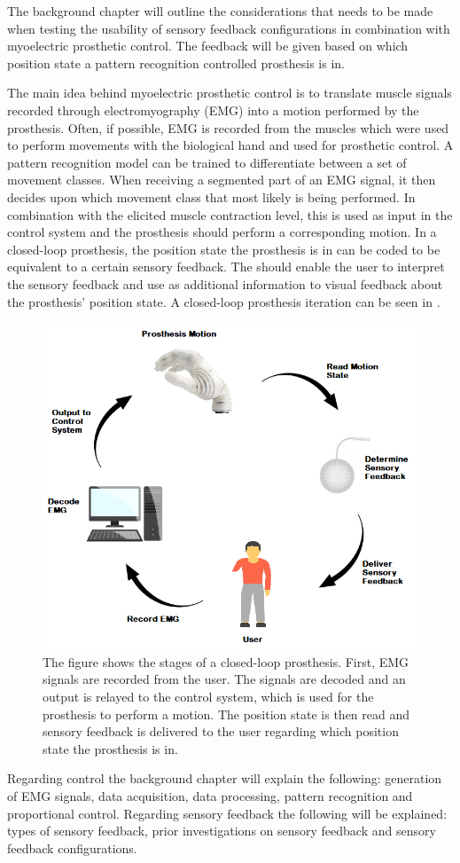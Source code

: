 The background chapter will outline the considerations that needs to be made when testing the usability of sensory feedback configurations in combination with myoelectric prosthetic control. The feedback will be given based on which position state a pattern recognition controlled prosthesis is in. 

The main idea behind myoelectric prosthetic control is to translate muscle signals recorded through electromyography (EMG) into a motion performed by the prosthesis. Often, if possible, EMG is recorded from the muscles which were used to perform movements with the biological hand and used for prosthetic control. A pattern recognition model can be trained to differentiate between a set of movement classes. When receiving a segmented part of an EMG signal, it then decides upon which movement class that most likely is being performed. In combination with the elicited muscle contraction level, this is used as input in the control system and the prosthesis should perform a corresponding motion. \cite{Guanglin2010} In a closed-loop prosthesis, the position state the prosthesis is in can be coded to be equivalent to a certain sensory feedback. The should enable the user to interpret the sensory feedback and use as additional information to visual feedback about the prosthesis' position state. \cite{Strbac2016} A closed-loop prosthesis iteration can be seen in . 

\begin{figure}[H]                 
	\includegraphics[width=.65\textwidth]{figures/closed_loop_pros}  
	\caption{The figure shows the stages of a closed-loop prosthesis. First, EMG signals are recorded from the user. The signals are decoded and an output is relayed to the control system, which is used for the prosthesis to perform a motion. The position state is then read and sensory feedback is delivered to the user regarding which position state the prosthesis is in.}
	\label{fig:closed_loop_pros} 
\end{figure}
Regarding control the background chapter will explain the following: generation of EMG signals, data acquisition, data processing, pattern recognition and proportional control. Regarding sensory feedback the following will be explained: types of sensory feedback, prior investigations on sensory feedback and sensory feedback configurations. 


